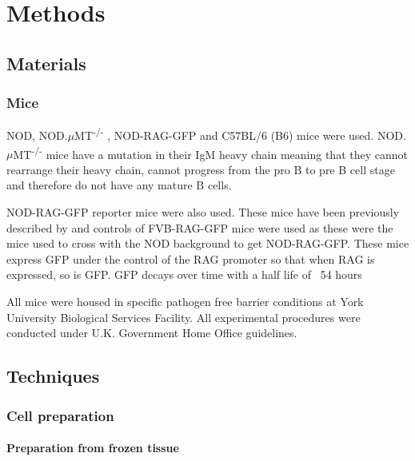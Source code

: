 
\chapter{Methods}

\section{Materials}

\subsection{Mice}
\label{methods:mice}

NOD, NOD.$\mu$MT\textsuperscript{-/-} \citep{Kitamura1991}, NOD-RAG-GFP and C57BL/6 (B6) mice were used.
NOD.$\mu$MT\textsuperscript{-/-} mice have a mutation in their IgM heavy chain meaning that they cannot rearrange their heavy chain, cannot progress from the pro B to pre B cell stage and therefore do not have any mature B cells.

NOD-RAG-GFP reporter mice were also used.
These mice have been previously described by  and controls of FVB-RAG-GFP mice were used as these were the mice used to cross with the NOD background to get NOD-RAG-GFP.
These mice express GFP under the control of the RAG promoter so that when RAG is expressed, so is GFP.
GFP decays over time with a half life of ~54 hours 

All mice were housed in specific pathogen free barrier conditions at York University Biological Services Facility. 
All experimental procedures were conducted under U.K. Government Home Office guidelines.



\section{Techniques}

\subsection{Cell preparation}

\subsubsection{Preparation from frozen tissue}

